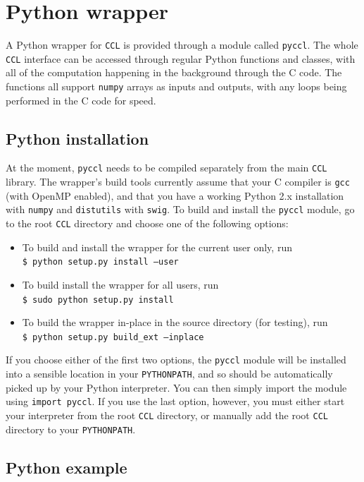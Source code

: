 \documentclass[\docopts]{\docclass}
\begin{document}
\section{Python wrapper}
\label{sec:python}

A Python wrapper for {\tt CCL} is provided through a module called {\tt pyccl}. The whole {\tt CCL} interface can be accessed through regular Python functions and classes, with all of the computation happening in the background through the C code. The functions all support {\tt numpy} arrays as inputs and outputs, with any loops being performed in the C code for speed.

\subsection{Python installation}
\label{sec:python:install}

At the moment, {\tt pyccl} needs to be compiled separately from the main {\tt CCL} library. The wrapper's build tools currently assume that your C compiler is {\tt gcc} (with OpenMP enabled), and that you have a working Python 2.x installation with {\tt numpy} and {\tt distutils} with {\tt swig}. To build and install the {\tt pyccl} module, go to the root {\tt CCL} directory and choose one of the following options:
\begin{itemize}
 \item To build and install the wrapper for the current user only, run \\
 {\tt \$ python setup.py install --user}
 \item To build install the wrapper for all users, run \\
 {\tt \$ sudo python setup.py install}
 \item To build the wrapper in-place in the source directory (for testing), run \\
 {\tt \$ python setup.py build\_ext --inplace}
\end{itemize}
If you choose either of the first two options, the {\tt pyccl} module will be installed into a sensible location in your {\tt PYTHONPATH}, and so should be automatically picked up by your Python interpreter. You can then simply import the module using {\tt import pyccl}. If you use the last option, however, you must either start your interpreter from the root {\tt CCL} directory, or manually add the root {\tt CCL} directory to your {\tt PYTHONPATH}.

\subsection{Python example}
\label{sec:python:example}
\end{document}
